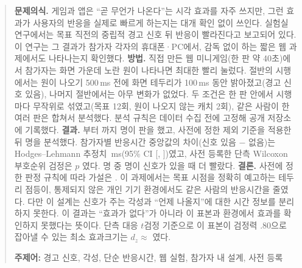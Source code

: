 \begin{abstract}
\noindent
\textbf{문제의식.} 게임과 앱은 ``곧 무언가 나온다''는 시각 효과를 자주 쓰지만, 그런 효과가 사용자의 반응을 실제로 빠르게 하는지는 대개 확인 없이 쓰인다.
실험실 연구에서는 목표 직전의 중립적 경고 신호 뒤 반응이 빨라진다고 보고되어 있다.
이 연구는 그 결과가 참가자 각자의 휴대폰·PC에서, 감독 없이 하는 짧은 웹 과제에서도 나타나는지 확인했다.
\textbf{방법.} 직접 만든 웹 미니게임(한 판 약 40초)에서 참가자는 화면 가운데 노란 원이 나타나면 최대한 빨리 눌렀다.
절반의 시행에서는 원이 나오기 500\,ms 전에 화면 테두리가 100\,ms 동안 밝아졌고(경고 신호 있음), 나머지 절반에서는 아무 변화가 없었다.
두 조건은 한 판 안에서 시행마다 무작위로 섞였고(목표 12회, 원이 나오지 않는 캐치 2회), 같은 사람이 한 여러 판은 합쳐서 분석했다.
분석 규칙은 데이터 수집 전에 고정해 공개 저장소에 기록했다.
\textbf{결과.} \CollectStart{}부터 \CollectEnd{}까지 \NplayersAll{}명이 \NRoundsAll{}판을 했고, 사전에 정한 제외 기준을 적용한 뒤 \Nanalyzed{}명을 분석했다.
참가자별 반응시간 중앙값의 차이(신호 있음 $-$ 없음)는 Hodges--Lehmann 추정치 \HL\,ms(95\% CI [\HLCIlo, \HLCIhi])였고,
사전 등록한 단측 Wilcoxon 부호순위 검정은 $p$ \Wp{}였다.
\Nnonzero{}명 중 \Kfaster{}명이 신호가 있을 때 더 빨랐다.
\textbf{결론.} 사전에 정한 판정 규칙에 따라 가설은 \ResVerdict.
\ifnum{}
이 과제에서는 목표 시점을 정확히 예고하는 테두리 점등이, 통제되지 않은 개인 기기 환경에서도 같은 사람의 반응시간을 줄였다.
다만 이 설계는 신호가 주는 각성과 ``언제 나올지''에 대한 시간 정보를 분리하지 못한다.
\else
이 결과는 ``효과가 없다''가 아니라 이 표본과 환경에서 효과를 확인하지 못했다는 뜻이다.
단측 대응 $t$검정 기준으로 이 표본이 검정력 .80으로 잡아낼 수 있는 최소 효과크기는 $d_z \approx$ \MDEdz{}였다.
\fi

\medskip\noindent
\textbf{주제어:} 경고 신호, 각성, 단순 반응시간, 웹 실험, 참가자 내 설계, 사전 등록
\end{abstract}
